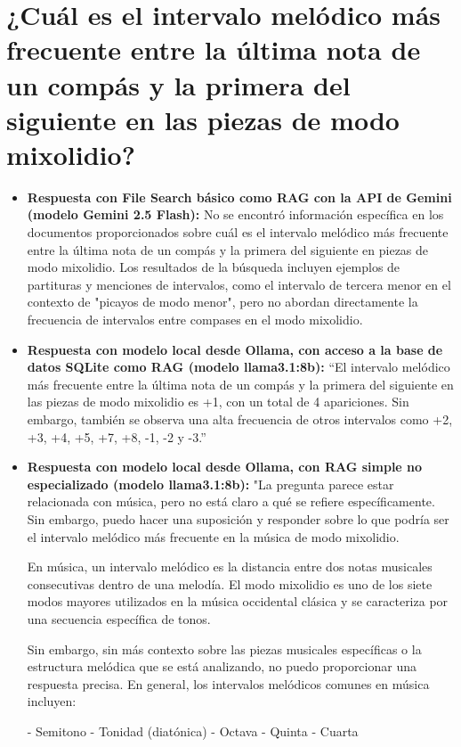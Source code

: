 \section{¿Cuál es el intervalo melódico más frecuente entre la última nota de un compás y la primera del siguiente en las piezas de modo mixolidio?}
\begin{itemize}
    \item \textbf{Respuesta con File Search básico como RAG con la API de Gemini (modelo Gemini 2.5 Flash):} No se encontró información específica en los documentos proporcionados sobre cuál es el intervalo melódico más frecuente entre la última nota de un compás y la primera del siguiente en piezas de modo mixolidio. Los resultados de la búsqueda incluyen ejemplos de partituras y menciones de intervalos, como el intervalo de tercera menor en el contexto de "picayos de modo menor", pero no abordan directamente la frecuencia de intervalos entre compases en el modo mixolidio.
    \item \textbf{Respuesta con modelo local desde Ollama, con acceso a la base de datos SQLite como RAG (modelo llama3.1:8b):} ``El intervalo melódico más frecuente entre la última nota de un compás y la primera del siguiente en las piezas de modo mixolidio es +1, con un total de 4 apariciones. Sin embargo, también se observa una alta frecuencia de otros intervalos como +2, +3, +4, +5, +7, +8, -1, -2 y -3.''
    \item \textbf{Respuesta con modelo local desde Ollama, con RAG simple no especializado (modelo llama3.1:8b):} "La pregunta parece estar relacionada con música, pero no está claro a qué se refiere específicamente. Sin embargo, puedo hacer una suposición y responder sobre lo que podría ser el intervalo melódico más frecuente en la música de modo mixolidio.

En música, un intervalo melódico es la distancia entre dos notas musicales consecutivas dentro de una melodía. El modo mixolidio es uno de los siete modos mayores utilizados en la música occidental clásica y se caracteriza por una secuencia específica de tonos.

Sin embargo, sin más contexto sobre las piezas musicales específicas o la estructura melódica que se está analizando, no puedo proporcionar una respuesta precisa. En general, los intervalos melódicos comunes en música incluyen:

- Semitono
- Tonidad (diatónica)
- Octava
- Quinta
- Cuarta


\end{itemize}
